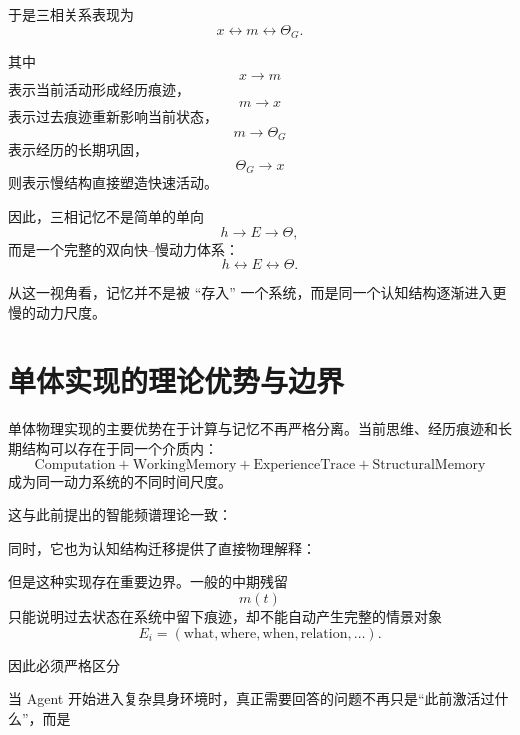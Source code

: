 于是三相关系表现为
\[
x
\leftrightarrow
m
\leftrightarrow
\Theta_G.
\]

其中
\[
x\rightarrow m
\]
表示当前活动形成经历痕迹，
\[
m\rightarrow x
\]
表示过去痕迹重新影响当前状态，
\[
m\rightarrow\Theta_G
\]
表示经历的长期巩固，
\[
\Theta_G\rightarrow x
\]
则表示慢结构直接塑造快速活动。

因此，三相记忆不是简单的单向
\[
h\rightarrow E\rightarrow\Theta,
\]
而是一个完整的双向快--慢动力体系：
\[
\boxed{
h
\leftrightarrow
E
\leftrightarrow
\Theta.
}
\]

从这一视角看，记忆并不是被 ``存入'' 一个系统，而是同一个认知结构逐渐进入更慢的动力尺度。

\section{单体实现的理论优势与边界}

单体物理实现的主要优势在于计算与记忆不再严格分离。当前思维、经历痕迹和长期结构可以存在于同一个介质内：
\[
\mathrm{Computation}
+
\mathrm{WorkingMemory}
+
\mathrm{ExperienceTrace}
+
\mathrm{StructuralMemory}
\]
成为同一动力系统的不同时间尺度。

这与此前提出的智能频谱理论一致：
\begin{statementbox}
\centering
{}
\end{statementbox}

同时，它也为认知结构迁移提供了直接物理解释：
\begin{statementbox}
\centering
{}
\end{statementbox}

但是这种实现存在重要边界。一般的中期残留
\[
m(t)
\]
只能说明过去状态在系统中留下痕迹，却不能自动产生完整的情景对象
\[
E_i
=
(
\mathrm{what},
\mathrm{where},
\mathrm{when},
\mathrm{relation},
\ldots
).
\]

因此必须严格区分
\begin{statementbox}
\centering
{}
\end{statementbox}

当 Agent 开始进入复杂具身环境时，真正需要回答的问题不再只是“此前激活过什么”，而是
\begin{statementbox}
\centering
{}
\end{statementbox}

